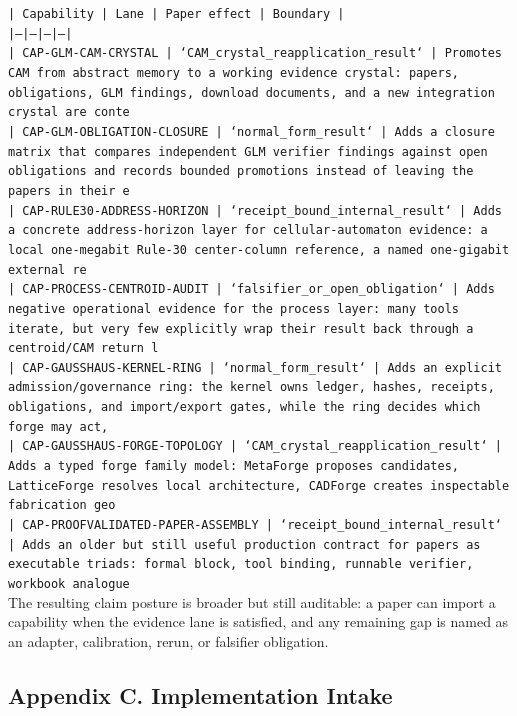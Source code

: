\documentclass[11pt]{article}
\begin{document}
\noindent\texttt{| Capability | Lane | Paper effect | Boundary |}\\
\noindent\texttt{|---|---|---|---|}\\
\noindent\texttt{| CAP-GLM-CAM-CRYSTAL | `CAM\_crystal\_reapplication\_result` | Promotes CAM from abstract memory to a working evidence crystal: papers, obligations, GLM findings, download documents, and a new integration crystal are conte}\\
\noindent\texttt{| CAP-GLM-OBLIGATION-CLOSURE | `normal\_form\_result` | Adds a closure matrix that compares independent GLM verifier findings against open obligations and records bounded promotions instead of leaving the papers in their e}\\
\noindent\texttt{| CAP-RULE30-ADDRESS-HORIZON | `receipt\_bound\_internal\_result` | Adds a concrete address-horizon layer for cellular-automaton evidence: a local one-megabit Rule-30 center-column reference, a named one-gigabit external re}\\
\noindent\texttt{| CAP-PROCESS-CENTROID-AUDIT | `falsifier\_or\_open\_obligation` | Adds negative operational evidence for the process layer: many tools iterate, but very few explicitly wrap their result back through a centroid/CAM return l}\\
\noindent\texttt{| CAP-GAUSSHAUS-KERNEL-RING | `normal\_form\_result` | Adds an explicit admission/governance ring: the kernel owns ledger, hashes, receipts, obligations, and import/export gates, while the ring decides which forge may act,}\\
\noindent\texttt{| CAP-GAUSSHAUS-FORGE-TOPOLOGY | `CAM\_crystal\_reapplication\_result` | Adds a typed forge family model: MetaForge proposes candidates, LatticeForge resolves local architecture, CADForge creates inspectable fabrication geo}\\
\noindent\texttt{| CAP-PROOFVALIDATED-PAPER-ASSEMBLY | `receipt\_bound\_internal\_result` | Adds an older but still useful production contract for papers as executable triads: formal block, tool binding, runnable verifier, workbook analogue}\\

The resulting claim posture is broader but still auditable: a paper can import a capability when the evidence lane is satisfied, and any remaining gap is named as an adapter, calibration, rerun, or falsifier obligation.

\subsection*{Appendix C. Implementation Intake}
\end{document}
